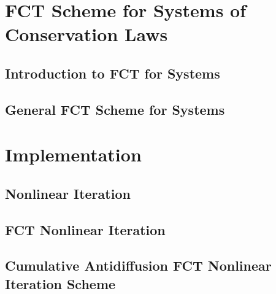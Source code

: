 \section{FCT Scheme for Systems of Conservation Laws\label{sec:fct_systems}}
\subsection{Introduction to FCT for Systems\label{sec:fct_systems_introduction}}
  
\subsection{General FCT Scheme for Systems\label{sec:fct_systems_scheme}}
  
\section{Implementation\label{sec:implementation}}
\subsection{Nonlinear Iteration\label{sec:nonlinear_iteration}}
  
\subsection{FCT Nonlinear Iteration
  \label{sec:fct_nonlinear_iteration}}
  
\subsection{Cumulative Antidiffusion FCT Nonlinear Iteration Scheme
  \label{sec:cumulative_antidiffusion}}
  

